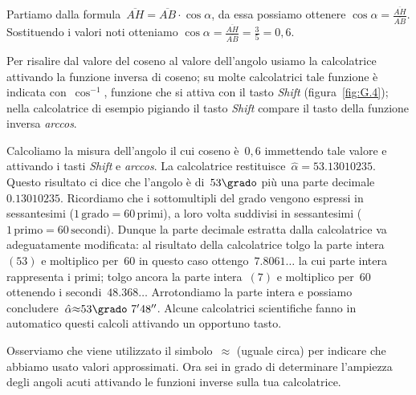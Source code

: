 \begin{soluzione}
 Partiamo dalla formula~$\overline{AH}=\overline{AB}\cdot \cos \alpha$, da essa 
possiamo ottenere
$\cos \alpha=\frac{\overline{AH}}{\overline{AB}}$. Sostituendo i valori noti 
otteniamo
$\cos \alpha=\frac{\overline{AH}}{\overline{AB}}=\frac{3}{5}=0,6$.

Per risalire dal valore del coseno al valore dell'angolo usiamo la calcolatrice 
attivando la funzione inversa di coseno; su molte calcolatrici
tale funzione è indicata con~$\cos^{-1}$, funzione che si attiva con il tasto 
\emph{Shift} (figura~\ref{fig:G.4}); nella calcolatrice
di esempio pigiando il tasto \emph{Shift} compare il tasto della funzione 
inversa \emph{arccos}.

Calcoliamo la misura dell'angolo il cui coseno è~$0,6$ immettendo tale valore e 
attivando i tasti \emph{Shift} e \emph{arccos}.
La calcolatrice restituisce~${\hat{\alpha}}= 53.13010235$.
Questo risultato ci dice che l'angolo è di~$53\grado$ più una parte 
decimale~$0.13010235$.
Ricordiamo che i sottomultipli del grado vengono espressi in sessantesimi ($1\, 
\text{grado}=60\, \text{primi}$),
a loro volta suddivisi in sessantesimi ($1\, \text{primo}=60\, \text{secondi}$).
Dunque la parte decimale estratta dalla calcolatrice va adeguatamente 
modificata:
al risultato della calcolatrice tolgo la parte intera~$(53)$ e moltiplico 
per~$60$ in questo caso ottengo~$7.8061\ldots$ la cui parte
intera rappresenta i primi; tolgo ancora la parte intera~$(7)$ e moltiplico 
per~$60$ ottenendo i secondi~$48.368\ldots$
Arrotondiamo la parte intera e possiamo 
concludere~$\hat{\alpha}{\approx}53\grado~7'48''$.
Alcune calcolatrici scientifiche fanno in automatico questi calcoli attivando 
un opportuno tasto.

Osserviamo che viene utilizzato il simbolo~${\approx}$ (uguale circa) per 
indicare che abbiamo usato valori approssimati.
Ora sei in grado di determinare l'ampiezza degli angoli acuti attivando le 
funzioni inverse sulla tua calcolatrice.
\end{soluzione}

